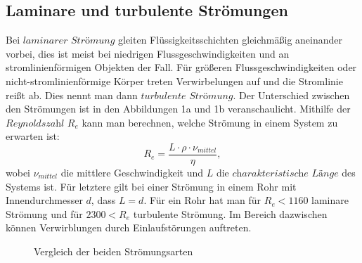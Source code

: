 \documentclass{article}
\begin{document}
\subsection{Laminare und turbulente Strömungen}
Bei $\textit{laminarer Strömung}$ gleiten Flüssigkeitsschichten gleichmäßig aneinander vorbei, dies ist meist bei niedrigen Flussgeschwindigkeiten und an stromlinienförmigen Objekten der Fall. Für größeren Flussgeschwindigkeiten oder nicht-stromlinienförmige Körper treten Verwirbelungen auf und die Stromlinie reißt ab. Dies nennt man dann $\textit{turbulente Strömung}$. Der Unterschied zwischen den Strömungen ist in den
Abbildungen 1a und 1b veranschaulicht.
Mithilfe der $\textit{Reynoldszahl}$ $ R_e$ kann man berechnen, welche Strömung in einem System zu erwarten ist:
\begin{equation}
    R_e = \frac{L \cdot \rho \cdot \nu_{mittel}}{\eta},
\end{equation}
wobei $\nu_{mittel}$ die mittlere Geschwindigkeit und $L$ die $\textit{charakteristische Länge}$ des Systems ist. Für letztere gilt bei einer Strömung in einem Rohr mit Innendurchmesser $d$, dass $L = d$. Für ein Rohr hat man für $R_e < 1160$ laminare Strömung und für $2300 < R_e$ turbulente Strömung. Im Bereich dazwischen können Verwirblungen durch Einlaufstörungen auftreten.
\begin{figure}[H]
    \centering
    \qquad
    \caption{Vergleich der beiden Strömungsarten \cite{1}}
    \label{fig:example}%
\end{figure}
\end{document}
